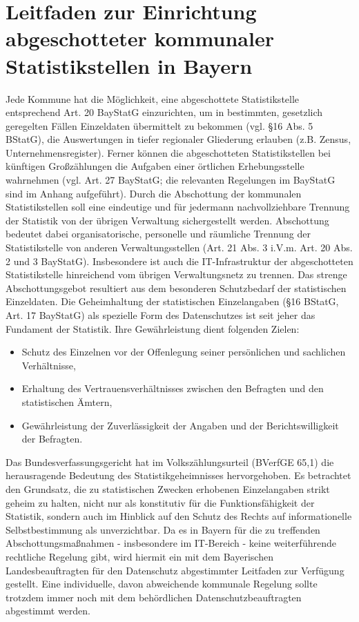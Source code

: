 \chapter[Leitfaden Abschottung]{Leitfaden zur Einrichtung abgeschotteter kommunaler Statistikstellen in Bayern}
Jede Kommune hat die Möglichkeit, eine abgeschottete Statistikstelle entsprechend Art. 20 BayStatG einzurichten, um in bestimmten, gesetzlich geregelten Fällen Einzeldaten übermittelt zu bekommen (vgl. \S 16 Abs. 5 BStatG), die Auswertungen in tiefer regionaler Gliederung erlauben (z.B. Zensus, Unternehmensregister). Ferner können die abgeschotteten Statistikstellen bei künftigen Großzählungen die Aufgaben einer örtlichen Erhebungsstelle wahrnehmen (vgl. Art. 27 BayStatG; die relevanten Regelungen im BayStatG sind im Anhang aufgeführt). Durch die Abschottung der kommunalen Statistikstellen soll eine eindeutige und für jedermann nachvollziehbare Trennung der Statistik von der übrigen Verwaltung sichergestellt werden. Abschottung bedeutet dabei organisatorische, personelle und räumliche Trennung der Statistikstelle von anderen Verwaltungsstellen (Art. 21 Abs. 3 i.V.m. Art. 20 Abs. 2 und 3 BayStatG). Insbesondere ist auch die IT-Infrastruktur der abgeschotteten Statistikstelle hinreichend vom übrigen Verwaltungsnetz zu trennen. Das strenge Abschottungsgebot resultiert aus dem besonderen Schutzbedarf der statistischen Einzeldaten. Die Geheimhaltung der statistischen Einzelangaben (\S 16 BStatG, Art. 17 BayStatG) als spezielle Form des Datenschutzes ist seit jeher das Fundament der Statistik. Ihre Gewährleistung dient folgenden Zielen:
\begin{itemize}
    \item Schutz des Einzelnen vor der Offenlegung seiner persönlichen und sachlichen Ver\-hält\-nisse,
    \item Erhaltung des Vertrauensverhältnisses zwischen den Befragten und den statistischen Ämtern,
    \item Gewährleistung der Zuverlässigkeit der Angaben und der Berichtswilligkeit der Befragten.
\end{itemize}
Das Bundesverfassungsgericht hat im Volkszählungsurteil (BVerfGE 65,1) die herausragende Bedeutung des Statistikgeheimnisses hervorgehoben. Es betrachtet den Grundsatz, die zu statistischen Zwecken erhobenen Einzelangaben strikt geheim zu halten, nicht nur als konstitutiv für die Funktionsfähigkeit der Statistik, sondern auch im Hinblick auf den Schutz des Rechts auf informationelle Selbstbestimmung als unverzichtbar.
Da es in Bayern für die zu treffenden Abschottungsmaßnahmen  - insbesondere im IT-Bereich - keine weiterführende rechtliche Regelung gibt, wird hiermit ein mit dem Bayerischen Landesbeauftragten für den Datenschutz abgestimmter Leitfaden zur Verfügung gestellt. Eine individuelle, davon abweichende kommunale Regelung sollte trotzdem immer noch mit dem behördlichen Datenschutzbeauftragten abgestimmt werden. 
